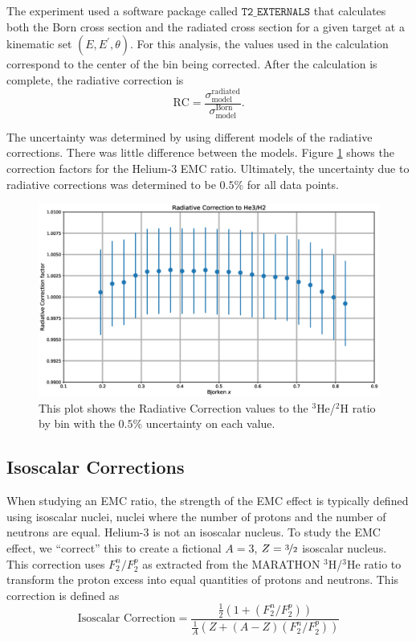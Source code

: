 The experiment used a software package called $\texttt{T2\_EXTERNALS}$ that calculates both the Born cross section and the radiated cross section for a given target at a kinematic set $(E,E^{\prime} ,\theta )$. For this analysis, the values used in the calculation correspond to the center of the bin being corrected. After the calculation is complete, the radiative correction is
\begin{equation}
	\textrm{RC} = \frac{\sigma^{\textrm{radiated}}_{\textrm{model}}}{\sigma^{\textrm{Born}}_{\textrm{model}}}.
\end{equation}

The uncertainty was determined by using different models of the radiative corrections. There was little difference between the models. Figure \ref{fig:radcor} shows the correction factors for the Helium-3 EMC ratio. Ultimately, the uncertainty due to radiative corrections was determined to be $0.5\%$ for all data points.

\begin{figure}
	\includegraphics[width=\textwidth]{./analysis/fig/radcor.eps}
	\caption{This plot shows the Radiative Correction values to the $^3$He/$^2$H ratio by bin with the $0.5\%$ uncertainty on each value.}
	\label{fig:radcor}
\end{figure}

\subsection{Isoscalar Corrections}
\label{sec:isocor}

When studying an EMC ratio, the strength of the EMC effect is typically defined using isoscalar nuclei, nuclei where the number of protons and the number of neutrons are equal. Helium-3 is not an isoscalar nucleus. To study the EMC effect, we ``correct'' this to create a fictional $A=3$, $Z=\nicefrac{3}{2}$ isoscalar nucleus. This correction uses $F_2^n/F_2^p$ as extracted from the MARATHON $^3$H/$^3$He ratio to transform the proton excess into equal quantities of protons and neutrons. This correction is defined as
\begin{equation}
	\textrm{Isoscalar Correction} = \frac{\frac{1}{2}\left(1+\left(F_2^n/F_2^p\right)\right)}{\frac{1}{A}\left(Z+\left(A-Z\right)\left(F_2^n/F_2^p\right)\right)}
\end{equation}

